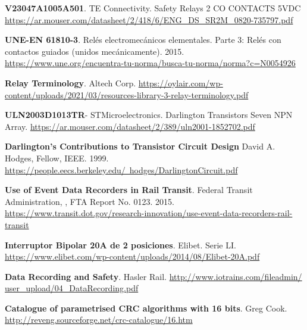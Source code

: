 \begin{thebibliography}{30}
\textbf{V23047A1005A501}. TE Connectivity. Safety Relays 2 CO CONTACTS 5VDC
\href{https://ar.mouser.com/datasheet/2/418/6/ENG_DS_SR2M_0820-735797.pdf}{https://ar.mouser.com/datasheet/2/418/6/ENG\_DS\_SR2M\_0820-735797.pdf}

\textbf{UNE-EN 61810-3}. Relés electromecánicos elementales. Parte 3: Relés con contactos guiados (unidos mecánicamente). 2015. 
\href{https://www.une.org/encuentra-tu-norma/busca-tu-norma/norma?c=N0054926}{https://www.une.org/encuentra-tu-norma/busca-tu-norma/norma?c=N0054926}


\textbf{Relay Terminology}. Altech Corp.
\href{https://oylair.com/wp-content/uploads/2021/03/resources-library-3-relay-terminology.pdf}{https://oylair.com/wp-content/uploads/2021/03/resources-library-3-relay-terminology.pdf}


\textbf{ULN2003D1013TR}- STMicroelectronics. Darlington Transistors Seven NPN Array.
\href{https://ar.mouser.com/datasheet/2/389/uln2001-1852702.pdf}{https://ar.mouser.com/datasheet/2/389/uln2001-1852702.pdf}

\textbf{Darlington’s Contributions to Transistor Circuit Design} David A. Hodges, Fellow, IEEE. 1999.
\href{https://people.eecs.berkeley.edu/~hodges/DarlingtonCircuit.pdf}{https://people.eecs.berkeley.edu/~hodges/DarlingtonCircuit.pdf}


\textbf{Use of Event Data Recorders in Rail Transit}. Federal Transit Administration, , FTA Report No. 0123. 2015.
\href{https://www.transit.dot.gov/research-innovation/use-event-data-recorders-rail-transit}{https://www.transit.dot.gov/research-innovation/use-event-data-recorders-rail-transit}

\textbf{Interruptor Bipolar 20A de 2 posiciones}. Elibet. Serie LI. 
\href{https://www.elibet.com/wp-content/uploads/2014/08/Elibet-20A.pdf}{https://www.elibet.com/wp-content/uploads/2014/08/Elibet-20A.pdf}

\textbf{Data Recording and Safety}. Hasler Rail. \href{http://www.iotrains.com/fileadmin/user_upload/04_DataRecording.pdf}{http://www.iotrains.com/fileadmin/ user\_upload/04\_DataRecording.pdf}

\textbf{Catalogue of parametrised CRC algorithms with 16 bits}. Greg Cook. 
\href{http://reveng.sourceforge.net/crc-catalogue/16.htm}{http://reveng.sourceforge.net/crc-catalogue/16.htm}



\end{thebibliography}
